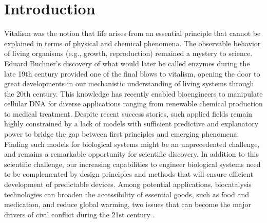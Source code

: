 \chapter*{Introduction} \label{ch:introduction}





Vitalism was the notion that life arises from an essential principle that cannot be explained in terms of physical and chemical phenomena.
The observable behavior of living organisms (e.g., growth, reproduction) remained a mystery to science.
Eduard Buchner's discovery of what would later be called enzymes during the late 19th century provided one of the final blows to vitalism, opening the door to
great developments in our mechanistic understanding of living systems through the 20th century.
This knowledge has recently enabled bioengineers to manipulate cellular DNA for diverse applications ranging from renewable chemical production to medical treatment. Despite recent success stories, such applied fields remain highly constrained by a lack of models with sufficient predictive and explanatory power to bridge the gap between first principles and emerging phenomena.
Finding such models for biological systems might be an unprecedented challenge, and remains a remarkable opportunity for scientific discovery.
In addition to this scientific challenge, our increasing capabilities to engineer biological systems need to be complemented by design principles and methods that will ensure efficient development of predictable devices. %
Among potential applications, biocatalysis technologies can broaden the accessibility of essential goods, such as food and medication, and reduce global warming, two issues that can become the major drivers of civil conflict during the 21st century \citep{barnett2007, hsiang2011, dod2015}. %

